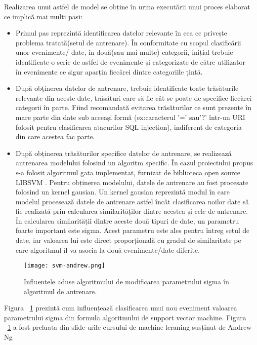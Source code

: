 Realizarea unui astfel de model se obține în urma executării unui proces elaborat ce implică mai mulți pași: 
\begin{itemize}
	\item  Primul pas reprezintă identificarea datelor relevante în cea ce privește problema tratată(setul de antrenare). În conformitate cu scopul clasificării unor evenimente/ date, în două(sau mai multe) categorii, inițial trebuie identificate o serie de astfel de evenimente și categorizate de către utilizator în evenimente ce sigur aparțin fiecărei dintre categoriile țintă. 
	\item  După  obținerea datelor de antrenare, trebuie identificate toate trăsăturile relevante din aceste date, trăsături care să fie cât se poate de specifice fiecărei categorii în parte. Fiind recomandată evitarea trăsăturilor ce sunt prezente în mare parte din date sub aceeași formă (ex:caracterul '=' sau'?' într-un URI folosit pentru clasificarea atacurilor SQL injection), indiferent de categoria din care acestea fac parte. 
	\item  După obținerea trăsăturilor specifice datelor de antrenare, se realizează antrenarea modelului folosind un algoritm specific. În cazul proiectului propus s-a folosit algoritmul gata implementat, furnizat de biblioteca open source LIBSVM  \cite{libsvm}.  Pentru obținerea modelului, datele de antrenare au fost procesate folosind un kernel gausian. Un kernel gausian reprezintă modul în care modelul procesează datele de antrenare astfel încât clasificarea noilor date să fie realizată prin calcularea similarităților dintre acestea și cele de antrenare. În calcularea similarității dintre aceste două tipuri de date, un parametru foarte important este sigma. Acest parametru este ales pentru întreg setul de date, iar valoarea lui este direct proporțională cu gradul de similaritate pe care algoritmul îl va asocia la două evenimente/date diferite. 
\end{itemize}



\begin{figure}[h]
	\centering
	\texttt{[image: svm-andrew.png]}
	\caption{ Influențele aduse algoritmului de modificarea parametrului sigma în algoritmul de antrenare. }
	\label{fig:rev-proxy}
\end{figure}


Figura ~\ref{fig:rev-proxy} prezintă cum influențează clasificarea unui nou eveniment valoarea parametrului sigma din formula algoritmului de support vector machine.  Figura ~\ref{fig:rev-proxy} a fost preluata din slide-urile cursului de machine leraning susținut de Andrew Ng \cite{andrew_ng} \\


